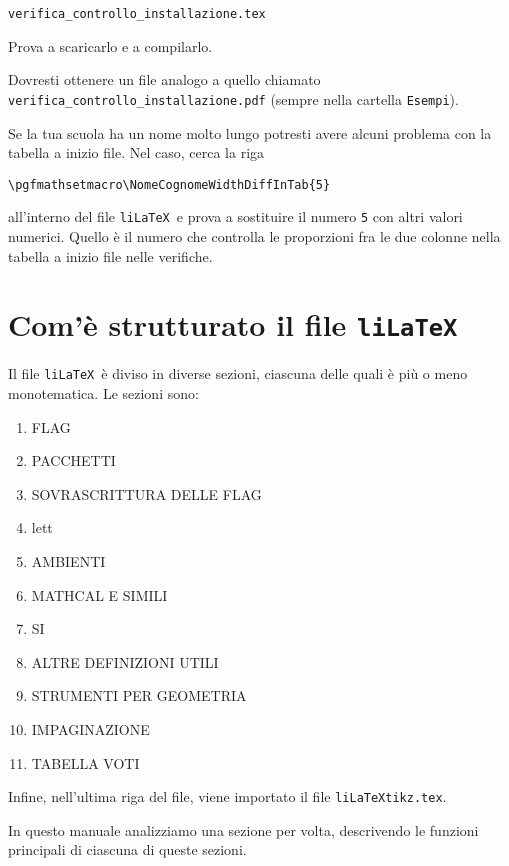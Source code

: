 \documentclass[italian, a4paper]{article}
\newcommand{\bs}{\textbackslash}
\newcommand{\ttt}[1]{\texttt{#1}}
\newcommand{\liLaTeX}{\ttt{liLaTeX}}
\begin{document}
\begin{center}\ttt{verifica\_controllo\_installazione.tex}\end{center}

Prova a scaricarlo e a compilarlo.

Dovresti ottenere un file analogo a quello chiamato \ttt{verifica\_controllo\_installazione.pdf} (sempre nella cartella \ttt{Esempi}).

Se la tua scuola ha un nome molto lungo potresti avere alcuni problema con la tabella a inizio file. Nel caso, cerca la riga

\begin{center}\ttt{\bs pgfmathsetmacro\bs NomeCognomeWidthDiffInTab\{5\}}\end{center}

all'interno del file \liLaTeX\ e prova a sostituire il numero \ttt{5} con altri valori numerici. Quello è il numero che controlla le proporzioni fra le due colonne nella tabella a inizio file nelle verifiche.

\section{Com'è strutturato il file \liLaTeX}
Il file \liLaTeX\ è diviso in diverse sezioni, ciascuna delle quali è più o meno monotematica. Le sezioni sono:
\begin{enumerate}[nolistsep]
\item FLAG
\item PACCHETTI
\item SOVRASCRITTURA DELLE FLAG
\item lett
\item AMBIENTI
\item MATHCAL E SIMILI
\item SI
\item ALTRE DEFINIZIONI UTILI
\item STRUMENTI PER GEOMETRIA
\item IMPAGINAZIONE
\item TABELLA VOTI
\end{enumerate}
Infine, nell'ultima riga del file, viene importato il file \ttt{liLaTeXtikz.tex}.

In questo manuale analizziamo una sezione per volta, descrivendo le funzioni principali di ciascuna di queste sezioni.
\end{document}
